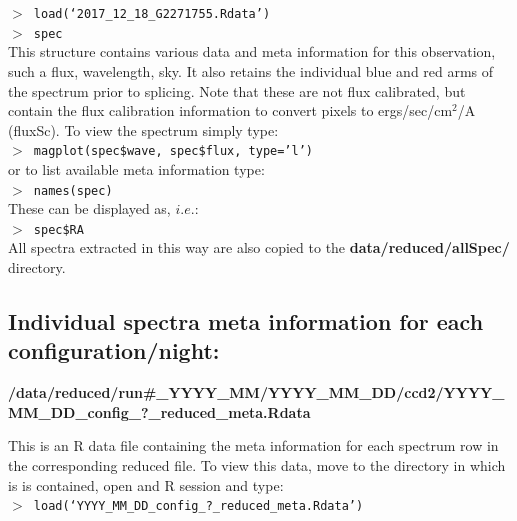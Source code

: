 \documentclass[12pt]{article}
\begin{document}
\hspace{10mm}  \texttt{$>$ load(`2017\_12\_18\_G2271755.Rdata')}\\

\hspace{10mm}  \texttt{$>$ spec}\\  

This structure contains various data and meta information for this observation, such a flux, wavelength, sky. It also retains the individual blue and red arms of the spectrum prior to splicing. Note that these are not flux calibrated, but contain the flux calibration information to convert pixels to ergs/sec/cm$^2$/A (fluxSc). To view the spectrum simply type:\\

 \hspace{10mm}  \texttt{$>$ magplot(spec\$wave, spec\$flux, type='l')}\\  

or to list available meta information type:\\

 \hspace{10mm}  \texttt{$>$ names(spec)}\\  

These can be displayed as, $i.e.$:\\

 \hspace{10mm}  \texttt{$>$ spec\$RA}\\ 
 
 All spectra extracted in this way are also copied to the \textbf{data/reduced/allSpec/} directory.


 \subsection{Individual spectra meta information for each configuration/night:} 
 
  \textbf{/data/reduced/run\#\_YYYY\_MM/YYYY\_MM\_DD/ccd2/YYYY\_MM\_DD\_config\_?\_reduced\_meta.Rdata} 
  
 This is an R data file containing the meta information for each spectrum row in the corresponding reduced file. To view this data, move to the directory in which is is contained, open and R session and type:\\
 

\hspace{10mm}  \texttt{$>$ load(`YYYY\_MM\_DD\_config\_?\_reduced\_meta.Rdata')}\\
\end{document}
